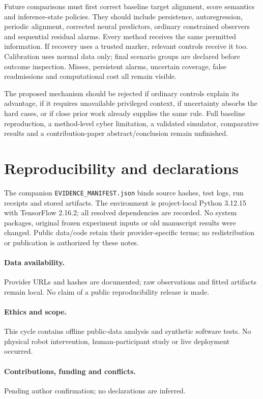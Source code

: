 \documentclass[11pt]{article}
\begin{document}
Future comparisons must first correct baseline target alignment, score semantics and inference-state policies. They should include persistence, autoregression, periodic alignment, corrected neural predictors, ordinary constrained observers and sequential residual alarms. Every method receives the same permitted information. If recovery uses a trusted marker, relevant controls receive it too. Calibration uses normal data only; final scenario groups are declared before outcome inspection. Misses, persistent alarms, uncertain coverage, false readmissions and computational cost all remain visible.

The proposed mechanism should be rejected if ordinary controls explain its advantage, if it requires unavailable privileged context, if uncertainty absorbs the hard cases, or if close prior work already supplies the same rule. Full baseline reproduction, a method-level cyber limitation, a validated simulator, comparative results and a contribution-paper abstract/conclusion remain unfinished.

\section{Reproducibility and declarations}
The companion \texttt{EVIDENCE\_MANIFEST.json} binds source hashes, test logs, run receipts and stored artifacts. The environment is project-local Python 3.12.15 with TensorFlow 2.16.2; all resolved dependencies are recorded. No system packages, original frozen experiment inputs or old manuscript results were changed. Public data/code retain their provider-specific terms; no redistribution or publication is authorized by these notes.

\paragraph{Data availability.} Provider URLs and hashes are documented; raw observations and fitted artifacts remain local. No claim of a public reproducibility release is made.
\paragraph{Ethics and scope.} This cycle contains offline public-data analysis and synthetic software tests. No physical robot intervention, human-participant study or live deployment occurred.
\paragraph{Contributions, funding and conflicts.} Pending author confirmation; no declarations are inferred.
\end{document}
